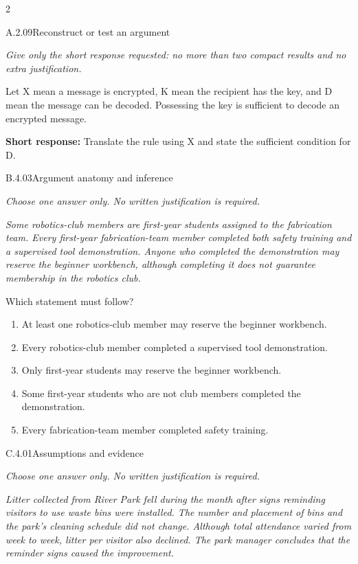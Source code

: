 \documentclass[9pt]{extarticle}
\newcommand{\choice}[1]{\item #1}
\begin{document}
\CoreWorkArea
\FormBreak
{}
\begin{multicols}{2}
\begin{DenseCoreProblem}{A.2.09}{Reconstruct or test an argument}
{\scriptsize\textit{Give only the short response requested: no more than two compact results and no extra justification.}\par}
Let X mean a message is encrypted, K mean the recipient has the key, and D mean the message can be decoded. Possessing the key is sufficient to decode an encrypted message.

\textbf{Short response:} Translate the rule using X and state the sufficient condition for D.
\end{DenseCoreProblem}
\begin{DenseCoreProblem}{B.4.03}{Argument anatomy and inference}
{\scriptsize\textit{Choose one answer only. No written justification is required.}\par}
\emph{Some robotics-club members are first-year students assigned to the fabrication team. Every first-year fabrication-team member completed both safety training and a supervised tool demonstration. Anyone who completed the demonstration may reserve the beginner workbench, although completing it does not guarantee membership in the robotics club.}

Which statement must follow?
\begin{enumerate}[label=(\alph*)]
  \choice{At least one robotics-club member may reserve the beginner workbench.}
  \choice{Every robotics-club member completed a supervised tool demonstration.}
  \choice{Only first-year students may reserve the beginner workbench.}
  \choice{Some first-year students who are not club members completed the demonstration.}
  \choice{Every fabrication-team member completed safety training.}
\end{enumerate}
\end{DenseCoreProblem}
\columnbreak
\begin{DenseCoreProblem}{C.4.01}{Assumptions and evidence}
{\scriptsize\textit{Choose one answer only. No written justification is required.}\par}
\emph{Litter collected from River Park fell during the month after signs reminding visitors to use waste bins were installed. The number and placement of bins and the park's cleaning schedule did not change. Although total attendance varied from week to week, litter per visitor also declined. The park manager concludes that the reminder signs caused the improvement.}


\end{DenseCoreProblem}
\end{multicols}
\end{document}
